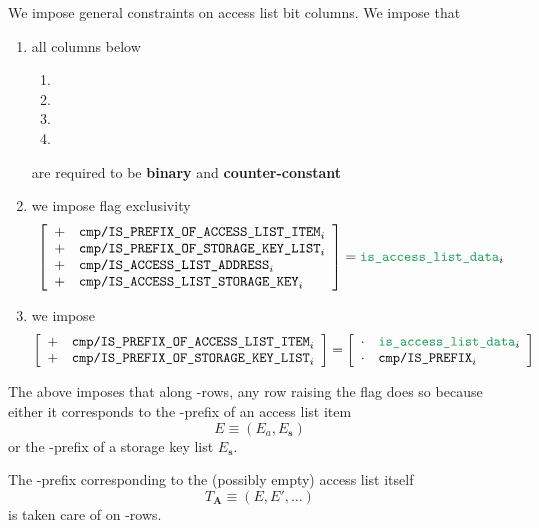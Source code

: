 \begin{center}
\end{center}
We impose general constraints on access list bit columns.
We impose that
\begin{enumerate}
    \item all columns below
	\begin{multicols}{2}
	    \begin{enumerate}
		\item
		    \rlpTxnComputationColumnIsPrefixOfAccessListItem
		\item
		    \rlpTxnComputationColumnIsPrefixOfStorageKeyList
		\item
		    \rlpTxnComputationColumnIsAccessListAddress
		\item
		    \rlpTxnComputationColumnIsAccessListStorageKey
	    \end{enumerate}
	\end{multicols}
	are required to be \textbf{binary} and \textbf{counter-constant}
    \item
	we impose flag exclusivity
	\[
	    \left[ \begin{array}{cl}
		+ & \rlpTxnComputationColumnIsPrefixOfAccessListItem _{i} \\
		+ & \rlpTxnComputationColumnIsPrefixOfStorageKeyList _{i} \\
		+ & \rlpTxnComputationColumnIsAccessListAddress      _{i} \\
		+ & \rlpTxnComputationColumnIsAccessListStorageKey   _{i} \\
	    \end{array} \right]
	    = \locAccessListData   _{i}
	\]
    \item
	we impose
	\[
	    \left[ \begin{array}{cl}
		+ & \rlpTxnComputationColumnIsPrefixOfAccessListItem     _{i} \\
		+ & \rlpTxnComputationColumnIsPrefixOfStorageKeyList _{i} \\
	    \end{array} \right]
	    =
	    \left[ \begin{array}{cl}
		\cdot & \locAccessListData               _{i} \\
		\cdot & \rlpTxnComputationColumnIsPrefix _{i} \\
	    \end{array} \right]
	\]
\end{enumerate}
\saNote{}
The above imposes that along \locAccessListData{}-rows, any row raising the
\rlpTxnComputationColumnIsPrefix{} flag does so because either it corresponds to
the \rlp{}-prefix of an access list item
\[
	E \equiv (E_a, E_\textbf{s})
\]
or
the \rlp{}-prefix of a storage key list $E_\textbf{s}$.

\saNote{}
The \rlp{}-prefix corresponding to the (possibly empty) access list itself
\[
	T_\mathbf{A} \equiv (E, E', \dots)
\]
is taken care of on \locAccessListPrefix{}-rows.
